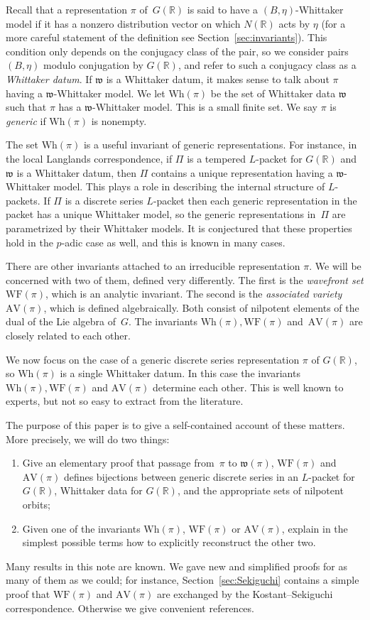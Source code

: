 \documentclass[cupthm]{CUP-JNL-JMJ}
\numberwithin{equation}{section}
\theoremstyle{cupplain}
\theoremstyle{cupdefinition}
\theoremstyle{cupremark}
\theoremstyle{cupproof}
\newcommand{\R}{\mathbb R}
\newcommand{\w}{\mathfrak w}
\newcommand{\AV}{\mathrm{AV}}
\newcommand{\Wh}{\mathrm{Wh}}
\newcommand{\WF}{\mathrm{WF}}
\begin{document}
Recall that a representation $\pi$ of~$G(\R)$ is said to {have a $(B,\eta)$-Whittaker model} if it has a nonzero distribution vector on which $N(\R)$ acts by $\eta$ (for a more careful statement of the definition see Section~\ref{sec:invariants}).
This condition only depends on the conjugacy class of the pair, 
so we  consider pairs $(B,\eta)$ modulo conjugation by $G(\R)$, and refer to such a conjugacy class
as a {\it Whittaker datum}.
If $\w$ is a Whittaker datum, it makes sense to talk about $\pi$ having a $\w$-Whittaker model. We let $\Wh(\pi)$  be the set of
Whittaker data $\w$ such that $\pi$ has a $\w$-Whittaker model. This is a small finite set.
We say $\pi$ is {\it generic} if $\Wh(\pi)$ is nonempty.

The set $\Wh(\pi)$ is
a useful invariant of generic representations.
For instance, in the local Langlands correspondence, if $\Pi$ is a tempered $L$-packet for $G(\R)$ and $\w$ is a Whittaker datum, then $\Pi$ contains a unique representation
having a $\w$-Whittaker model. This plays a role in describing the internal structure of $L$-packets.
If $\Pi$ is a discrete series $L$-packet then each generic representation in the packet has a unique
Whittaker model, so the generic representations in~$\Pi$ are parametrized by their Whittaker models.
It is conjectured that these properties hold in the $p$-adic case as well, and this is known in many cases.

There are other invariants attached to an
irreducible representation $\pi$.  We will be concerned with two of
them, defined very differently. The first is the \emph{wavefront set} $\WF(\pi)$,
which is an analytic invariant.
The second is the \emph{associated variety} $\AV(\pi)$, which is
defined  algebraically.
Both consist of nilpotent elements of the dual of the Lie algebra of~$G$.
The invariants $\Wh(\pi), \WF(\pi)$ and~$\AV(\pi)$ are closely related to each other.

We now focus on the case of a generic discrete series representation
$\pi$ of $G(\R)$, so $\Wh(\pi)$ is a single Whittaker datum.  In this
case the invariants $\Wh(\pi), \WF(\pi)$ and $\AV(\pi)$ determine each
other. This is well known to experts, but not so easy to extract
from the literature. 

The purpose
of this paper is to give a self-contained account of these matters. More precisely, we will do two things:
\begin{enumerate}
\item Give an elementary proof that  passage from~$\pi$ to $\mathfrak{w}(\pi)$, $\WF(\pi)$ and $\AV(\pi)$ defines bijections between generic discrete series in an $L$-packet for $G(\R)$, Whittaker data for $G(\R)$, and the appropriate sets of nilpotent orbits;
\item Given one of the invariants $\Wh(\pi)$, $\WF(\pi)$ or $\AV(\pi)$, explain in the simplest possible terms how to explicitly reconstruct the other two.
\end{enumerate}
Many results in this note are known. We gave new and simplified proofs for as many of them as we could; for instance, Section~\ref{sec:Sekiguchi} contains a simple proof that $\WF(\pi)$ and $\AV(\pi)$ are exchanged by the Kostant--Sekiguchi correspondence. Otherwise we give convenient references.
\end{document}
